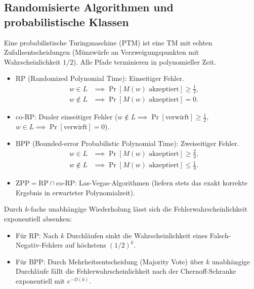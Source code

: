 \subsection{Randomisierte Algorithmen und probabilistische Klassen}

\begin{definition}
    Eine probabilistische Turingmaschine (PTM) ist eine TM mit echten Zufallsentscheidungen (Münzwürfe an Verzweigungspunkten mit Wahrscheinlichkeit $1/2$). Alle Pfade terminieren in polynomieller Zeit.
    \begin{itemize}
        \item $\mathrm{RP}$ (Randomized Polynomial Time): Einseitiger Fehler.
        \begin{align*}
            w \in L &\implies \Pr[M(w) \text{ akzeptiert}] \ge \tfrac{1}{2}, \\
            w \notin L &\implies \Pr[M(w) \text{ akzeptiert}] = 0.
        \end{align*}
        \item $\mathrm{co\text{-}RP}$: Dualer einseitiger Fehler ($w \notin L \implies \Pr[\text{verwirft}] \ge \frac{1}{2}$, $w \in L \implies \Pr[\text{verwirft}] = 0$).
        \item $\mathrm{BPP}$ (Bounded-error Probabilistic Polynomial Time): Zweiseitiger Fehler.
        \begin{align*}
            w \in L &\implies \Pr[M(w) \text{ akzeptiert}] \ge \tfrac{2}{3}, \\
            w \notin L &\implies \Pr[M(w) \text{ akzeptiert}] \le \tfrac{1}{3}.
        \end{align*}
        \item $\mathrm{ZPP} = \mathrm{RP} \cap \mathrm{co\text{-}RP}$: Las-Vegas-Algorithmen (liefern stets das exakt korrekte Ergebnis in erwarteter Polynomialzeit).
    \end{itemize}
\end{definition}

\begin{theorem}
    Durch $k$-fache unabhängige Wiederholung lässt sich die Fehlerwahrscheinlichkeit exponentiell absenken:
    \begin{itemize}
        \item Für $\mathrm{RP}$: Nach $k$ Durchläufen sinkt die Wahrscheinlichkeit eines Falsch-Negativ-Fehlers auf höchstens $(1/2)^k$.
        \item Für $\mathrm{BPP}$: Durch Mehrheitsentscheidung (Majority Vote) über $k$ unabhängige Durchläufe fällt die Fehlerwahrscheinlichkeit nach der Chernoff-Schranke exponentiell mit $e^{-\Omega(k)}$.
    \end{itemize}
\end{theorem}

